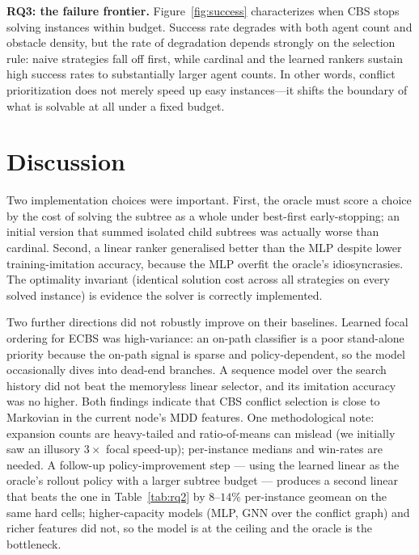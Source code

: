 \documentclass{article}
\theoremstyle{plain}
\theoremstyle{definition}
\theoremstyle{remark}
\begin{document}
\textbf{RQ3: the failure frontier.} Figure~\ref{fig:success} characterizes when
CBS stops solving instances within budget. Success rate degrades with both agent
count and obstacle density, but the rate of degradation depends strongly on the
selection rule: naive strategies fall off first, while cardinal and the learned
rankers sustain high success rates to substantially larger agent counts. In
other words, conflict prioritization does not merely speed up easy instances---it
shifts the boundary of what is solvable at all under a fixed budget.

\vspace{-4pt}
\section{Discussion}
\vspace{-6pt}
Two implementation choices were important. First, the oracle must score a choice
by the cost of solving the subtree as a whole under best-first early-stopping;
an initial version that summed isolated child subtrees was actually worse than
cardinal. Second, a linear ranker generalised better than the MLP despite lower
training-imitation accuracy, because the MLP overfit the oracle's idiosyncrasies.
The optimality invariant (identical solution cost across all strategies on every
solved instance) is evidence the solver is correctly implemented.

Two further directions did not robustly improve on their baselines. Learned
focal ordering for ECBS was high-variance: an on-path classifier is a poor
stand-alone priority because the on-path signal is sparse and policy-dependent,
so the model occasionally dives into dead-end branches. A sequence model over
the search history did not beat the memoryless linear selector, and its
imitation accuracy was no higher. Both findings indicate that CBS conflict
selection is close to Markovian in the current node's MDD features. One
methodological note: expansion counts are heavy-tailed and ratio-of-means can
mislead (we initially saw an illusory $3\times$ focal speed-up); per-instance
medians and win-rates are needed. A follow-up policy-improvement step ---
using the learned linear as the oracle's rollout policy with a larger subtree
budget --- produces a second linear that beats the one in Table~\ref{tab:rq2}
by $8$--$14\%$ per-instance geomean on the same hard cells; higher-capacity
models (MLP, GNN over the conflict graph) and richer features did not, so the
model is at the ceiling and the oracle is the bottleneck.
\end{document}
